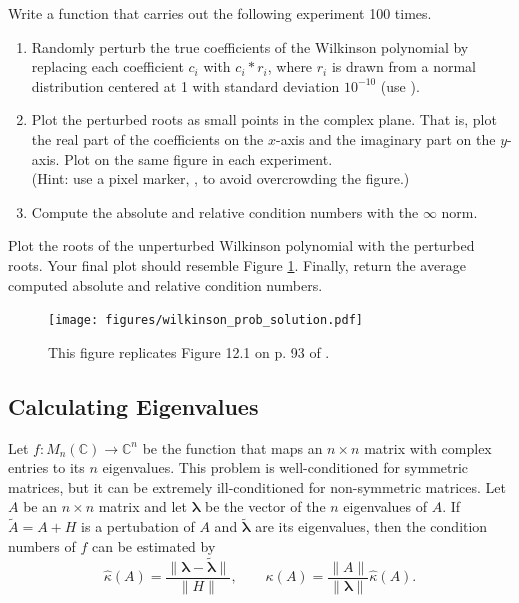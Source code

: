\begin{problem}
Write a function that carries out the following experiment 100 times.
\begin{enumerate}
\item Randomly perturb the true coefficients of the Wilkinson polynomial by replacing each coefficient $c_i$ with $c_i*r_i$, where $r_i$ is drawn from a normal distribution centered at 1 with standard deviation $10^{-10}$ (use ).
\item Plot the perturbed roots as small points in the complex plane.
That is, plot the real part of the coefficients on the $x$-axis and the imaginary part on the $y$-axis.
Plot on the same figure in each experiment.
\\(Hint: use a pixel marker, , to avoid overcrowding the figure.)
\item Compute the absolute and relative condition numbers with the $\infty$ norm.
\end{enumerate}
Plot the roots of the unperturbed Wilkinson polynomial with the perturbed roots.
Your final plot should resemble Figure \ref{fig:wilkinsonpolynomial_many}.
Finally, return the average computed absolute and relative condition numbers.

\begin{figure}[H]
\texttt{[image: figures/wilkinson\_prob\_solution.pdf]}
\caption{
This figure replicates Figure 12.1 on p. 93 of \cite{Trefethen1997}.}
\label{fig:wilkinsonpolynomial_many}
\end{figure}

\label{prob:wilkinson-polynomial-roots}
\end{problem}

\subsection*{Calculating Eigenvalues} %

Let $f:M_n(\mathbb{C}) \rightarrow \mathbb{C}^n$ be the function that maps an $n \times n$ matrix with complex entries to its $n$ eigenvalues.
This problem is well-conditioned for symmetric matrices, but it can be extremely ill-conditioned for non-symmetric matrices.
Let $A$ be an $n\times n$ matrix and let $\boldsymbol{\lambda}$ be the vector of the $n$ eigenvalues of $A$.
If $\tilde{A} = A + H$ is a pertubation of $A$ and $\tilde{\boldsymbol{\lambda}}$ are its eigenvalues, then the condition numbers of $f$ can be estimated by
\begin{equation}
\hat{\kappa}(A) = \frac{\|\boldsymbol{\lambda} - \tilde{\boldsymbol{\lambda}}\|}{\|H\|},
\qquad
\kappa(A) = \frac{\|A\|}{\|\boldsymbol{\lambda}\|}\hat{\kappa}(A).
\label{eq:eig-condition-numbers}
\end{equation}

